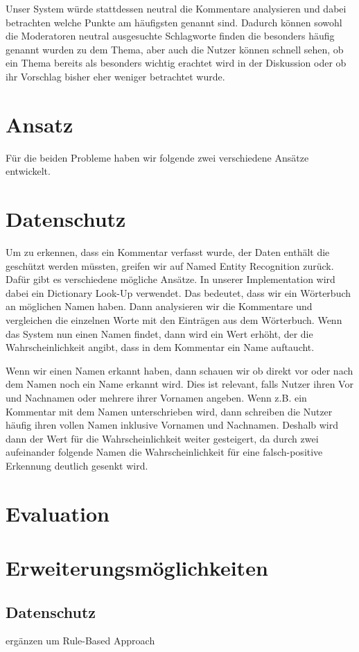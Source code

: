 \documentclass[runningheads]{llncs}
\begin{document}
Unser System würde stattdessen neutral die Kommentare analysieren und dabei betrachten welche Punkte am häufigsten genannt sind.
Dadurch können sowohl die Moderatoren neutral ausgesuchte Schlagworte finden die besonders häufig genannt wurden zu dem Thema, aber auch die Nutzer können schnell sehen, ob ein Thema bereits als besonders wichtig erachtet wird in der Diskussion oder ob ihr Vorschlag bisher eher weniger betrachtet wurde.

\section{Ansatz}
Für die beiden Probleme haben wir folgende zwei verschiedene Ansätze entwickelt.
\section{Datenschutz}
Um zu erkennen, dass ein Kommentar verfasst wurde, der Daten enthält die geschützt werden müssten, greifen wir auf Named Entity Recognition zurück.
Dafür gibt es verschiedene mögliche Ansätze.
In unserer Implementation wird dabei ein Dictionary Look-Up verwendet.
Das bedeutet, dass wir ein Wörterbuch an möglichen Namen haben.
Dann analysieren wir die Kommentare und vergleichen die einzelnen Worte mit den Einträgen aus dem Wörterbuch.
Wenn das System nun einen Namen findet, dann wird ein Wert erhöht, der die Wahrscheinlichkeit angibt, dass in dem Kommentar ein Name auftaucht.

Wenn wir einen Namen erkannt haben, dann schauen wir ob direkt vor oder nach dem Namen noch ein Name erkannt wird.
Dies ist relevant, falls Nutzer ihren Vor und Nachnamen oder mehrere ihrer Vornamen angeben. Wenn z.B. ein Kommentar mit dem Namen unterschrieben wird, dann schreiben die Nutzer häufig ihren vollen Namen inklusive Vornamen und Nachnamen.
Deshalb wird dann der Wert für die Wahrscheinlichkeit weiter gesteigert, da durch zwei aufeinander folgende Namen die Wahrscheinlichkeit für eine falsch-positive Erkennung deutlich gesenkt wird.
\section{Evaluation}

\section{Erweiterungsmöglichkeiten}
\subsection{Datenschutz}
ergänzen um Rule-Based Approach %
\end{document}
